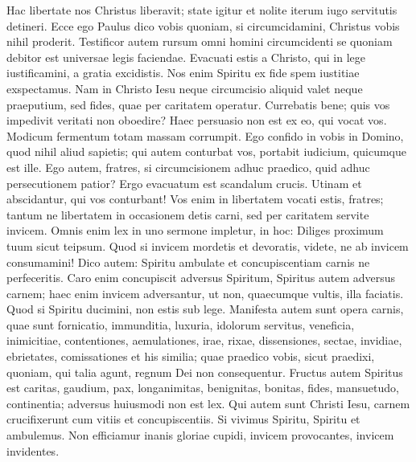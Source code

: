 \begin{biblechapter}
\begin{biblechapter}
\begin{biblechapter}
\begin{biblechapter}
\begin{biblechapter}
\verse Hac libertate nos Christus liberavit; state igitur et nolite iterum iugo servitutis detineri. 
 \verse Ecce ego Paulus dico vobis quoniam, si circumcidamini, Christus vobis nihil proderit. 
\verse Testificor autem rursum omni homini circumcidenti se quoniam debitor est universae legis faciendae. 
\verse Evacuati estis a Christo, qui in lege iustificamini, a gratia excidistis. 
\verse Nos enim Spiritu ex fide spem iustitiae exspectamus. 
\verse Nam in Christo Iesu neque circumcisio aliquid valet neque praeputium, sed fides, quae per caritatem operatur.
 \verse Currebatis bene; quis vos impedivit veritati non oboedire? 
\verse Haec persuasio non est ex eo, qui vocat vos. 
\verse Modicum fermentum totam massam corrumpit. 
\verse Ego confido in vobis in Domino, quod nihil aliud sapietis; qui autem conturbat vos, portabit iudicium, quicumque est ille. 
\verse Ego autem, fratres, si circumcisionem adhuc praedico, quid adhuc persecutionem patior? Ergo evacuatum est scandalum crucis. 
\verse Utinam et abscidantur, qui vos conturbant!
 \verse Vos enim in libertatem vocati estis, fratres; tantum ne libertatem in occasionem detis carni, sed per caritatem servite invicem.
 \verse Omnis enim lex in uno sermone impletur, in hoc: Diliges proximum tuum sicut teipsum. 
\verse Quod si invicem mordetis et devoratis, videte, ne ab invicem consumamini!
 \verse Dico autem: Spiritu ambulate et concupiscentiam carnis ne perfeceritis. 
 \verse Caro enim concupiscit adversus Spiritum, Spiritus autem adversus carnem; haec enim invicem adversantur, ut non, quaecumque vultis, illa faciatis. 
\verse Quod si Spiritu ducimini, non estis sub lege. 
\verse Manifesta autem sunt opera carnis, quae sunt fornicatio, immunditia, luxuria, 
\verse idolorum servitus, veneficia, inimicitiae, contentiones, aemulationes, irae, rixae, dissensiones, sectae, 
\verse invidiae, ebrietates, comissationes et his similia; quae praedico vobis, sicut praedixi, quoniam, qui talia agunt, regnum Dei non consequentur. 
 \verse Fructus autem Spiritus est caritas, gaudium, pax, longanimitas, benignitas, bonitas, fides, 
\verse mansuetudo, continentia; adversus huiusmodi non est lex. 
 \verse Qui autem sunt Christi Iesu, carnem crucifixerunt cum vitiis et concupiscentiis. 
\verse Si vivimus Spiritu, Spiritu et ambulemus.
 \verse Non efficiamur inanis gloriae cupidi, invicem provocantes, invicem invidentes.
 

\end{biblechapter}
\end{biblechapter}
\end{biblechapter}
\end{biblechapter}
\end{biblechapter}
